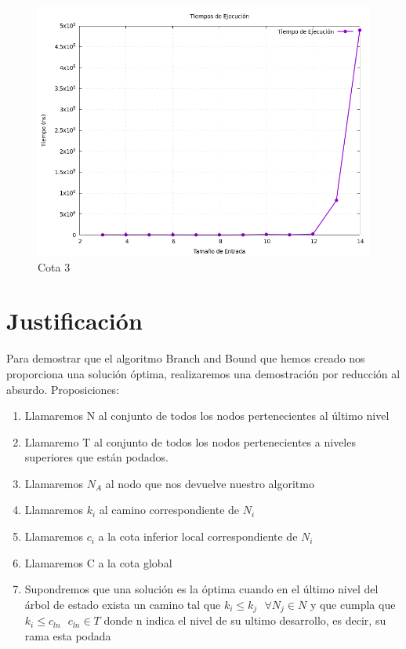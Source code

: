 \documentclass[11pt,openany]{book}
\begin{document}
\begin{figure}[H]
       \begin{minipage}{.48\textwidth}
        \centering
        \includegraphics[width=1\linewidth]{assets/Img/Cota_3_BB/Cota3_grafico_tiempos.png}
        \caption{Cota 3 }
        \label{fig:Tiempos}
       \end{minipage}

\end{figure}
\newpage

\section{Justificación}

Para demostrar que el algoritmo Branch and Bound que hemos creado nos proporciona una solución óptima, realizaremos una
demostración por reducción al absurdo. Proposiciones:
\begin{enumerate}
      \item Llamaremos N al conjunto de todos los nodos pertenecientes al último nivel
      \item Llamaremo T al conjunto de todos los nodos pertenecientes a niveles superiores que están podados.
      \item Llamaremos $N_A$ al nodo que nos devuelve nuestro algoritmo
      \item Llamaremos $k_i$ al camino correspondiente de $N_i$
      \item Llamaremos $c_i$ a la cota inferior local correspondiente de $N_i$
      \item Llamaremos C a la cota global
      \item Supondremos que una solución es la óptima cuando en el último nivel del árbol de estado exista
      un camino tal que $k_i \leq k_j \ \ \ \forall N_j \in N$ y que cumpla que $k_i \leq c_{ln}  \ \ \ c_{ln} \in T $ donde 
      n indica el nivel de su ultimo desarrollo, es decir, su rama esta podada 
\end{enumerate}
\end{document}
